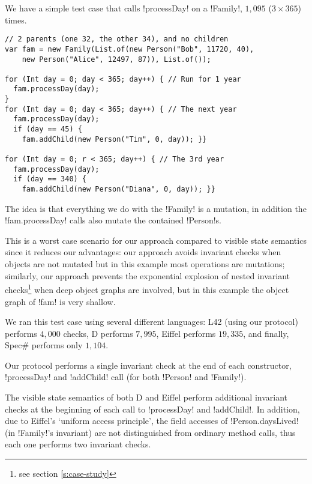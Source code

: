 \noindent We have a simple test case that calls \Q!processDay! on a \Q!Family!, $1{,}095$ ($3\times365$) times.
\begin{lstlisting}
// 2 parents (one 32, the other 34), and no children
var fam = new Family(List.of(new Person("Bob", 11720, 40),
    new Person("Alice", 12497, 87)), List.of());
    
for (Int day = 0; day < 365; day++) { // Run for 1 year
  fam.processDay(day);
}
for (Int day = 0; day < 365; day++) { // The next year
  fam.processDay(day);
  if (day == 45) {
    fam.addChild(new Person("Tim", 0, day)); }}

for (Int day = 0; r < 365; day++) { // The 3rd year
  fam.processDay(day);
  if (day == 340) {
    fam.addChild(new Person("Diana", 0, day)); }}
\end{lstlisting}

The idea is that everything we do with the \Q!Family! is a mutation, in addition the \Q!fam.processDay! calls also mutate the contained \Q!Person!s.

This is a worst case scenario for our approach compared to visible state semantics since it reduces our advantages:
our approach avoids invariant checks when objects are not mutated
but in this example most operations are mutations; 
similarly, our approach prevents the exponential explosion of nested invariant checks\footnote{see section \ref{s:case-study}} when deep object graphs are involved, but in this example the object graph of \Q!fam! is very shallow.
\loseSpace

We ran this test case using several different languages: L42 (using our protocol) performs $4{,}000$ checks, D performs $7{,}995$, Eiffel performs $19{,}335$, and finally, Spec\# performs only $1{,}104$.

Our protocol performs a single invariant check at the end of each constructor,  \Q!processDay! and \Q!addChild! call (for both \Q!Person! and \Q!Family!). 

The visible state semantics of both D and Eiffel perform additional invariant checks at the beginning of each call to \Q!processDay! and \Q!addChild!. In addition, due to Eiffel's `uniform access principle', the field accesses of \Q!Person.daysLived! (in  \Q!Family!'s invariant) are not distinguished from ordinary method calls, thus each one performs two invariant checks.

